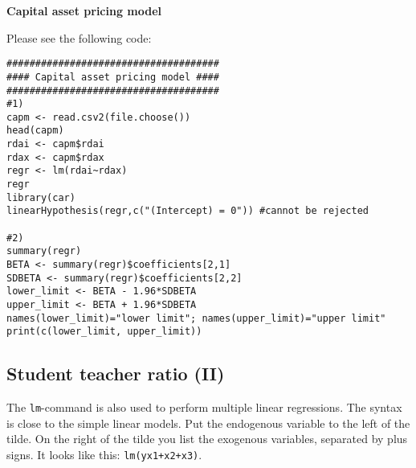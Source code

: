 \documentclass{article}
\begin{document}
\begin{solution}
\textbf{Capital asset pricing model}

Please see the following code:
\begin{verbatim}
#####################################
#### Capital asset pricing model ####
#####################################
#1)
capm <- read.csv2(file.choose())
head(capm)
rdai <- capm$rdai
rdax <- capm$rdax
regr <- lm(rdai~rdax)
regr
library(car)
linearHypothesis(regr,c("(Intercept) = 0")) #cannot be rejected

#2)
summary(regr)
BETA <- summary(regr)$coefficients[2,1]
SDBETA <- summary(regr)$coefficients[2,2]
lower_limit <- BETA - 1.96*SDBETA
upper_limit <- BETA + 1.96*SDBETA
names(lower_limit)="lower limit"; names(upper_limit)="upper limit"
print(c(lower_limit, upper_limit))
\end{verbatim}
\end{solution}


\subsection{Student teacher ratio (II)}

The \texttt{lm}-command is also used to perform multiple linear regressions.
The syntax is close to the simple linear models. Put the endogenous variable
to the left of the tilde. On the right of the tilde you list the exogenous
variables, separated by plus signs. It looks like this: \texttt{lm(yx1+x2+x3)}.
\end{document}
